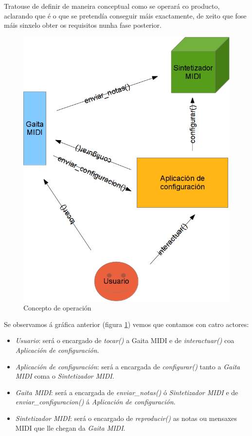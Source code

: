  Tratouse de definir de maneira conceptual como se operará co producto,
 aclarando que é o que se pretendía conseguir máis exactamente, de xeito que
 fose máis sinxelo obter os requisitos nunha fase posterior. \\

 \begin{figure}[htbp]
  \centering
  \includegraphics[scale=0.6,keepaspectratio=true]{./imagenes/concepto-operacion.png}
  \caption{Concepto de operación}
  \label{figura:ConceptoOperacion}
 \end{figure}

 Se observamos á gráfica anterior (figura \ref{figura:ConceptoOperacion}) vemos
 que contamos con catro actores:

 \begin{itemize}
  \item \textit{Usuario}: será o encargado de \textit{tocar()} a Gaita MIDI e
        de \textit{interactuar()} coa \textit{Aplicación de configuración}.
  \item \textit{Aplicación de configuración}: será a encargada de
        \textit{configurar()} tanto a \textit{Gaita MIDI} coma o
        \textit{Sintetizador MIDI}.
  \item \textit{Gaita MIDI}: será a encargada de \textit{enviar\_notas()} ó
        \textit{Sintetizador MIDI} e de \textit{enviar\_configuracion()} á
        \textit{Aplicación de configuración}.
  \item \textit{Sintetizador MIDI}: será o encargado de \textit{reproducir()} as
        notas ou mensaxes MIDI que lle chegan da \textit{Gaita MIDI}.
 \end{itemize}

